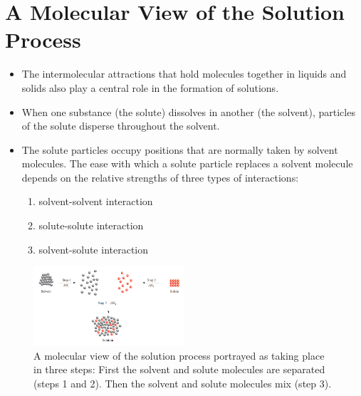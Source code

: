 \documentclass[a4paper,12pt,twocolumn]{article}
\begin{document}
\section{A Molecular View of the Solution Process}
\begin{itemize}
\item The intermolecular attractions that hold molecules together in liquids and solids also play a central role in the formation of solutions. 
\item When one substance (the solute) dissolves in another (the solvent), particles of the solute disperse throughout the solvent.
\item The solute particles occupy positions that are normally taken by solvent molecules. The ease with which a solute particle replaces a solvent molecule depends on the relative strengths of three types of interactions:
    \begin{enumerate}
        \item solvent-solvent interaction
        \item solute-solute interaction
        \item solvent-solute interaction
    \end{enumerate}
\end{itemize}

\begin{figure}[h]
\includegraphics[width=0.5\textwidth]{Screenshot 2023-03-23 121400.png}
\caption{A molecular view of the solution process portrayed as taking place in three steps: First the solvent and solute molecules are separated (steps 1 and 2). Then the solvent and solute molecules mix (step 3).}
\end{figure}
\end{document}
